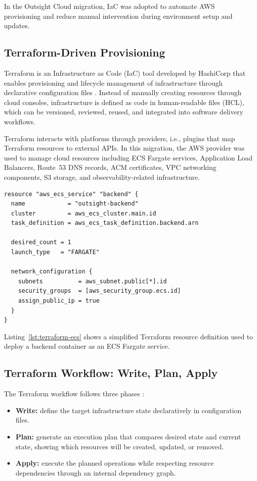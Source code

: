 In the Outsight Cloud migration, IaC was adopted to automate AWS provisioning and reduce manual intervention during environment setup and updates.

\subsection{Terraform-Driven Provisioning}
Terraform is an Infrastructure as Code (IaC) tool developed by HashiCorp that enables provisioning and lifecycle management of infrastructure through declarative configuration files \cite{hashicorpTerraformIntro}. Instead of manually creating resources through cloud consoles, infrastructure is defined as code in human-readable files (HCL), which can be versioned, reviewed, reused, and integrated into software delivery workflows.

Terraform interacts with platforms through providers, i.e., plugins that map Terraform resources to external APIs. In this migration, the AWS provider was used to manage cloud resources including ECS Fargate services, Application Load Balancers, Route~53 DNS records, ACM certificates, VPC networking components, S3 storage, and observability-related infrastructure.

\begin{lstlisting}[language={},caption={Simplified ECS Fargate service definition},label={lst:terraform-ecs}]
resource "aws_ecs_service" "backend" {
  name            = "outsight-backend"
  cluster         = aws_ecs_cluster.main.id
  task_definition = aws_ecs_task_definition.backend.arn

  desired_count = 1
  launch_type   = "FARGATE"

  network_configuration {
    subnets          = aws_subnet.public[*].id
    security_groups  = [aws_security_group.ecs.id]
    assign_public_ip = true
  }
}
\end{lstlisting}

Listing~\ref{lst:terraform-ecs} shows a simplified Terraform resource definition used to deploy a backend container as an ECS Fargate service.

\subsection{Terraform Workflow: Write, Plan, Apply}
The Terraform workflow follows three phases \cite{hashicorpTerraformIntro}:
\begin{itemize}
    \item \textbf{Write:} define the target infrastructure state declaratively in configuration files.
    \item \textbf{Plan:} generate an execution plan that compares desired state and current state, showing which resources will be created, updated, or removed.
    \item \textbf{Apply:} execute the planned operations while respecting resource dependencies through an internal dependency graph.
\end{itemize}


